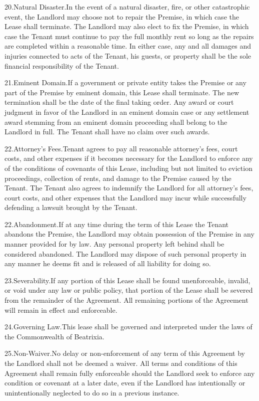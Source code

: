 20.\quad Natural Disaster.\quad In the event of a natural disaster, fire, or other
catastrophic event, the Landlord may choose not to repair the Premise, in which
case the Lease shall terminate.  The Landlord may also elect to fix the
Premise, in which case the Tenant must continue to pay the full monthly rent so
long as the repairs are completed within a reasonable time.  In either case,
any and all damages and injuries connected to acts of the Tenant, his guests,
or property shall be the sole financial responsibility of the Tenant.

21.\quad Eminent Domain.\quad If a government or private entity takes the Premise or any
part of the Premise by eminent domain, this Lease shall terminate.  The new
termination shall be the date of the final taking order.  Any award or court
judgment in favor of the Landlord in an eminent domain case or any settlement
award stemming from an eminent domain proceeding shall belong to the Landlord
in full.  The Tenant shall have no claim over such awards. 

22.\quad Attorney's Fees.\quad Tenant agrees to pay all reasonable attorney's fees,
court costs, and other expenses if it becomes necessary for the Landlord to
enforce any of the conditions of covenants of this Lease, including but not
limited to eviction proceedings, collection of rents, and damage to the Premise
caused by the Tenant.  The Tenant also agrees to indemnify the Landlord for all
attorney's fees, court costs, and other expenses that the Landlord may incur
while successfully defending a lawsuit brought by the Tenant.

22.\quad Abandonment.\quad If at any time during the term of this Lease the Tenant
abandons the Premise, the Landlord may obtain possession of the Premise in any
manner provided for by law.  Any personal property left behind shall be
considered abandoned. The Landlord may dispose of such personal property in any
manner he deems fit and is released of all liability for doing so. 

23.\quad Severability.\quad If any portion of this Lease shall be found unenforceable,
invalid, or void under any law or public policy, that portion of the Lease
shall be severed from the remainder of the Agreement.  All remaining portions
of the Agreement will remain in effect and enforceable.

24.\quad Governing Law.\quad This lease shall be governed and interpreted under the laws
of the Commonwealth of Beatrixia.

25.\quad Non-Waiver.\quad No delay or non-enforcement of any term of this Agreement by
the Landlord shall not be deemed a waiver.  All terms and conditions of this
Agreement shall remain fully enforceable should the Landlord seek to enforce
any condition or covenant at a later date, even if the Landlord has
intentionally or unintentionally neglected to do so in a previous instance.  


